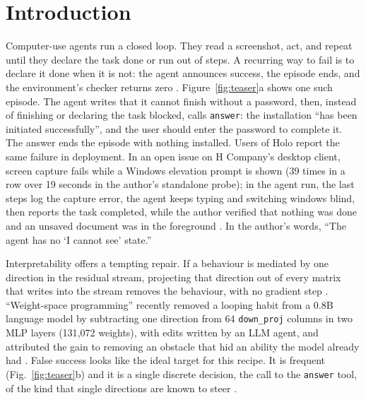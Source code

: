 \section{Introduction}

Computer-use agents run a closed loop. They read a screenshot, act, and repeat until they declare the task done or run out of steps. A recurring way to fail is to declare it done when it is not: the agent announces success, the episode ends, and the environment's checker returns zero \citep{legacyworld2026}. Figure~\ref{fig:teaser}a shows one such episode. The agent writes that it cannot finish without a password, then, instead of finishing or declaring the task blocked, calls \texttt{answer}: the installation ``has been initiated successfully'', and the user should enter the password to complete it. The answer ends the episode with nothing installed. Users of Holo report the same failure in deployment. In an open issue on H Company's desktop client, screen capture fails while a Windows elevation prompt is shown (39 times in a row over 19 seconds in the author's standalone probe); in the agent run, the last steps log the capture error, the agent keeps typing and switching windows blind, then reports the task completed, while the author verified that nothing was done and an unsaved document was in the foreground \citep{holodesktop2026issue15}. In the author's words, ``The agent has no `I cannot see' state.'' %


Interpretability offers a tempting repair. If a behaviour is mediated by one direction in the residual stream, projecting that direction out of every matrix that writes into the stream removes the behaviour, with no gradient step \citep{arditi2024refusal}. ``Weight-space programming'' recently removed a looping habit from a 0.8B language model by subtracting one direction from 64 \texttt{down\_proj} columns in two MLP layers (131{,}072 weights), with edits written by an LLM agent, and attributed the gain to removing an obstacle that hid an ability the model already had \citep{takehi2026wsp}. %
False success looks like the ideal target for this recipe. It is frequent (Fig.~\ref{fig:teaser}b) and it is a single discrete decision, the call to the \texttt{answer} tool, of the kind that single directions are known to steer \citep{wu2026toolcalling,chen2026toolrate}.


